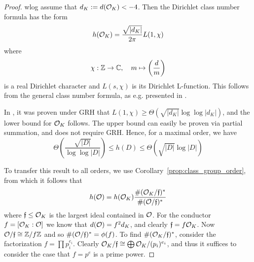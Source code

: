 \begin{proof}
    wlog assume that $d_K := d(\mathcal{O}_K) < -4$.
    Then the Dirichlet class number formula has the form
    \begin{equation*}
        h(\mathcal{O}_K) = \frac {\sqrt{|d_K|}} {2\pi} L(1, \chi)
    \end{equation*}
    where
    \begin{equation*}
        \chi: \mathbb{Z} \to \mathbb{C}, \quad m \mapsto \left(\frac d m\right)
    \end{equation*}
    is a real Dirichlet character and $L(s, \chi)$ is its Dirichlet L-function.
    This follows from the general class number formula, as e.g. presented in \cite[Korollar~VII.5.11]{neukirch}.

    In \cite[Thm~1]{class_number_lower_bound}, it was proven under GRH that $L(1, \chi) \geq \Theta(\sqrt{|d_K|}\log\log|d_K|)$, and the lower bound for $\mathcal{O}_K$ follows.
    The upper bound can easily be proven via partial summation, and does not require GRH.
    Hence, for a maximal order, we have
    \begin{equation*}
        \Theta\left(\frac {\sqrt{|D|}} {\log\log|D|}\right) \leq h(D) \leq \Theta\left(\sqrt{|D|} \log|D|\right)
    \end{equation*}

    To transfer this result to all orders, we use Corollary~\ref{prop:class_group_order}, from which it follows that
    \begin{equation*}
        h(\mathcal{O}) = h(\mathcal{O}_K) \frac {\#(\mathcal{O}_K / \mathfrak{f})^*} {\#(\mathcal{O} / \mathfrak{f})^*}
    \end{equation*}
    where $\mathfrak{f} \leq \mathcal{O}_K$ is the largest ideal contained in $\mathcal{O}$.
    For the conductor $f = [\mathcal{O}_K : \mathcal{O}]$ we know that $d(\mathcal{O}) = f^2 d_K$, and clearly $\mathfrak{f} = f\mathcal{O}_K$.
    Now $\mathcal{O}/\mathfrak{f} \cong \mathbb{Z}/f\mathbb{Z}$ and so $\#(\mathcal{O}/\mathfrak{f})^* = \phi(f)$.
    To find $\#(\mathcal{O}_K/\mathfrak{f})^*$, consider the factorization $f = \prod p_i^{e_i}$.
    Clearly $\mathcal{O}_K/\mathfrak{f} \cong \bigoplus \mathcal{O}_K/(p_i)^{e_i}$, and thus it suffices to consider the case that $f = p^e$ is a prime power.


\end{proof}
